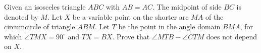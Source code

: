 Given an isosceles triangle $ABC$ with $AB = AC$. The midpoint of side $BC$ is denoted by $M$. Let $X$ be a variable point on the shorter arc $MA$ of the circumcircle of triangle $ABM$. Let $T$ be the point in the angle domain $BMA$, for which $\angle TMX = 90^{\circ}$ and $TX = BX$. Prove that $\angle MTB - \angle CTM$ does not depend on $X$.
